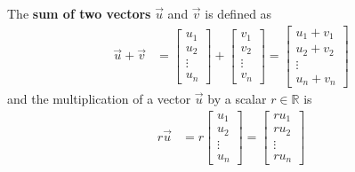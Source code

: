 The \textbf{sum of two vectors} $\vec{u}$ and $\vec{v}$ is defined as
%
\begin{align*}
\vec{u} + \vec{v} & = \begin{bmatrix}
u_1 \\ u_2 \\ \vdots \\ u_n 
\end{bmatrix} + \begin{bmatrix}
v_1 \\ v_2 \\ \vdots \\ v_n 
\end{bmatrix} = \begin{bmatrix}
u_1 + v_1 \\ u_2 + v_2 \\ \vdots \\ u_n + v_n 
\end{bmatrix}
\end{align*}
%
and the multiplication of a vector $\vec{u}$ by a scalar $r \in \mathbb{R}$ is
%
\begin{align*}
r \vec{u} & = r  \begin{bmatrix}
u_1 \\ u_2 \\ \vdots \\ u_n 
\end{bmatrix} = \begin{bmatrix}
r u_1 \\ r u_2 \\ \vdots \\r  u_n 
\end{bmatrix}
\end{align*}

